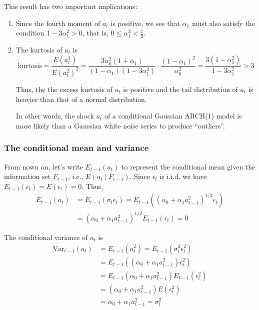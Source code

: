 \documentclass[a4paper,11pt]{article}
\newcommand{\var}{\mathrm{Var}}
\begin{document}
This result has two important implications:
\begin{enumerate}
\item Since the fourth moment of \(a_t\) is positive, we see that \(\alpha_1\) must
also satisfy the condition \(1-3\alpha_1^2 > 0\), that is, \(0 \leq
   \alpha^2_1 < \frac{1}{3}\).
\item The kurtosis of \(a_t\) is
\[\text{kurtosis} = \frac{E(a^4_t)}{E(a^2_t)^2} =
   \frac{3\alpha^2_0(1+\alpha_1)}{(1-\alpha_1)(1-3\alpha^2_1)} \cdot
   \frac{(1-\alpha_1)^2}{\alpha_0^2} =
   \frac{3(1-\alpha^2_1)}{1-3\alpha_1^2}  > 3\]

Thus, the the excess kurtosis of \(a_t\) is positive and the tail
distribution of \(a_t\) is heavier than that of a normal
distribution.

In other words, the shock \(a_t\) of a conditional Gaussian ARCH(1) model
is more likely than a Gaussian white noise series to produce
“outliers”.
\end{enumerate}

\subsubsection*{The conditional mean and variance}
\label{sec:org120dba8}

From nown on, let's write \(E_{t-1}(a_t)\) to represent the conditional mean given the
information set \(F_{t-1}\), i.e., \(E(a_t \mid F_{t-1})\).
Since \(\epsilon_t\) is i.i.d, we have \(E_{t-1}(\epsilon_t) =
E(\epsilon_t) = 0\). Thus,
\begin{equation*}
\begin{split}
E_{t-1}(a_t) &= E_{t-1}(\sigma_t \epsilon_t) = E_{t-1}\left((\alpha_0 + \alpha_1 a^2_{t-1})^{1/2} \epsilon_t\right) \\
&= (\alpha_0 + \alpha_1 a^2_{t-1})^{1/2} E_{t-1}(\epsilon_t) = 0
\end{split}
\end{equation*}

The conditional variance of \(a_t\) is
\begin{equation*}
\begin{split}
\var_{t-1}(a_t) &= E_{t-1}(a^2_t) = E_{t-1} \left( \sigma^2_t \epsilon_t^2 \right) \\
&= E_{t-1}\left((\alpha_0 + \alpha_1 a^2_{t-1}) \epsilon^2_t \right) \\
&= E_{t-1}(\alpha_0 + \alpha_1 a^2_{t-1}) E_{t-1}(\epsilon^2_t) \\
&= (\alpha_0 + \alpha_1 a^2_{t-1}) E(\epsilon^2_t) \\
&= \alpha_0 + \alpha_1 a^2_{t-1} = \sigma^2_t
\end{split}
\end{equation*}
\end{document}
